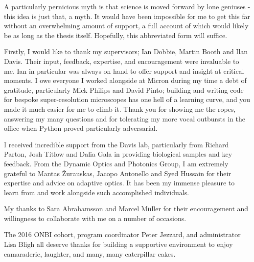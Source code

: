 \begin{acknowledgements}
	
	\vspace{-0.75cm}
	
	{\small %
		
		A particularly pernicious myth is that science is moved forward by 
		lone geniuses - this idea is just that, a myth. It would have been 
		impossible for me to get this far without an overwhelming amount of 
		support, a full account of which would likely be as long as the 
		thesis itself. Hopefully, this abbreviated form  will suffice.
		
		Firstly, I would like to thank my supervisors; Ian Dobbie, Martin 
		Booth and Ilan Davis. Their input, feedback, expertise, and 
		encouragement were invaluable to me. Ian in particular was always 
		on hand to offer support and insight at critical moments. I owe 
		everyone I worked alongside at Micron during my time a debt of 
		gratitude, particularly Mick Philips and David Pinto; building and 
		writing code for bespoke super-resolution microscopes has one hell 
		of a learning curve, and you made it much easier for me to climb 
		it. Thank you for showing me the ropes, answering my many questions 
		and for tolerating my more vocal outbursts in the office when 
		Python proved particularly adversarial. 
		
		I received incredible support from the Davis lab, particularly from Richard Parton, Josh Titlow and Dalia Gala in providing biological 
		samples and key feedback. From the Dynamic Optics and Photonics 
		Group, I am extremely grateful to Mantas \v{Z}urauskas, Jacopo 
		Antonello and Syed Hussain for their expertise and advice on 
		adaptive optics. It has been my immense pleasure to learn from and 
		work alongside such accomplished individuals. 
		
		My thanks to Sara Abrahamsson and Marcel M\"{u}ller for their encouragement and willingness to collaborate with me on a number of occasions. 
		
		The 2016 ONBI cohort, program coordinator Peter Jezzard, and 
		administrator Lisa Bligh all deserve thanks for building a 
		supportive environment to enjoy camaraderie, laughter, and many, 
		many caterpillar cakes.
		
}
\end{acknowledgements}
